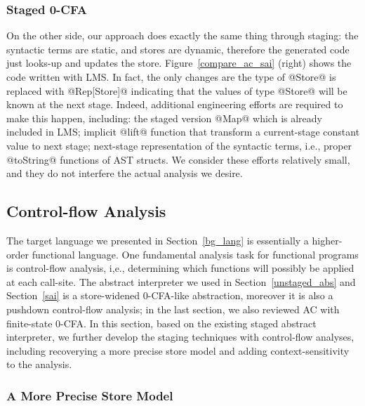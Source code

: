 \subsubsection{Staged 0-CFA}

On the other side, our approach does exactly the same thing through staging: the
syntactic terms are static, and stores are dynamic, therefore the generated code
just looks-up and updates the store. Figure~\ref{compare_ac_sai} (right) shows
the code written with LMS. In fact, the only changes are the type of @Store@ is
replaced with @Rep[Store]@ indicating that the values of type @Store@ will be
known at the next stage. Indeed, additional engineering efforts are required to
make this happen, including: the staged version @Map@ which is already included
in LMS; implicit @lift@ function that transform a current-stage constant value
to next stage; next-stage representation of the syntactic terms, i.e., proper
@toString@ functions of AST structs. We consider these efforts relatively small,
and they do not interfere the actual analysis we desire.


\subsection{Control-flow Analysis} \label{cfa}

The target language we presented in Section~\ref{bg_lang} is essentially a
higher-order functional language. One fundamental analysis task for functional
programs is control-flow analysis, i,e., determining which functions will
possibly be applied at each call-site. The abstract interpreter we used in
Section~\ref{unstaged_abs} and Section~\ref{sai} is a store-widened 0-CFA-like
abstraction, moreover it is also a pushdown control-flow analysis; in the last
section, we also reviewed AC with finite-state 0-CFA. In this section, based on
the existing staged abstract interpreter, we further develop the staging
techniques with control-flow analyses, including recoverying a more precise
store model and adding context-sensitivity to the analysis.

\subsubsection{A More Precise Store Model}

